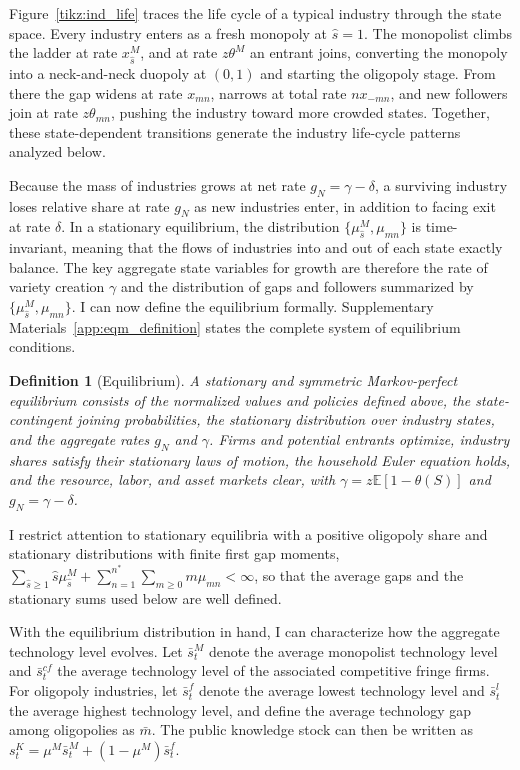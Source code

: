 \documentclass[12pt]{article}
\newtheorem{definition}[proposition]{Definition}
\begin{document}
Figure~\ref{tikz:ind_life} traces the life cycle of a typical industry through the state space. Every industry enters as a fresh monopoly at \(\hat{s} = 1\). The monopolist climbs the ladder at rate \(x^M_{\hat{s}}\), and at rate \(z\theta^M\) an entrant joins, converting the monopoly into a neck-and-neck duopoly at \((0,1)\) and starting the oligopoly stage. From there the gap widens at rate \(x_{mn}\), narrows at total rate \(nx_{-mn}\), and new followers join at rate \(z\theta_{mn}\), pushing the industry toward more crowded states. Together, these state-dependent transitions generate the industry life-cycle patterns analyzed below.

Because the mass of industries grows at net rate \(g_N=\gamma-\delta\), a surviving industry loses relative share at rate \(g_N\) as new industries enter, in addition to facing exit at rate \(\delta\). In a stationary equilibrium, the distribution \(\{\mu^M_{\hat{s}}, \mu_{mn}\}\) is time-invariant, meaning that the flows of industries into and out of each state exactly balance. The key aggregate state variables for growth are therefore the rate of variety creation \(\gamma\) and the distribution of gaps and followers summarized by \(\{\mu^M_{\hat{s}}, \mu_{mn}\}\). I can now define the equilibrium formally. Supplementary Materials~\ref{app:eqm_definition} states the complete system of equilibrium conditions.

\begin{definition}[Equilibrium]
A stationary and symmetric Markov-perfect equilibrium consists of the normalized values and policies defined above, the state-contingent joining probabilities, the stationary distribution over industry states, and the aggregate rates \(g_N\) and \(\gamma\). Firms and potential entrants optimize, industry shares satisfy their stationary laws of motion, the household Euler equation holds, and the resource, labor, and asset markets clear, with \(\gamma=z\mathbb{E}[1-\theta(S)]\) and \(g_N=\gamma-\delta\).
\end{definition}

I restrict attention to stationary equilibria with a positive oligopoly share and stationary distributions with finite first gap moments, \(\sum_{\hat{s}\geq1}\hat{s}\mu^M_{\hat{s}} + \sum_{n=1}^{n^\ast}\sum_{m\geq0} m\mu_{mn} < \infty\), so that the average gaps and the stationary sums used below are well defined.

With the equilibrium distribution in hand, I can characterize how the aggregate technology level evolves. Let \(\bar{s}^M_t\) denote the average monopolist technology level and \(\bar{s}^{cf}_t\) the average technology level of the associated competitive fringe firms. For oligopoly industries, let \(\bar{s}^f_t\) denote the average lowest technology level and \(\bar{s}^l_t\) the average highest technology level, and define the average technology gap among oligopolies as \(\bar{m}\). The public knowledge stock can then be written as \(s^K_t = \mu^M \bar{s}^M_t + (1-\mu^M)\bar{s}^f_t\).
\end{document}
